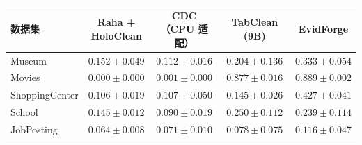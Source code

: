 \par\addvspace{6pt}\noindent\begin{minipage}{\columnwidth}
\centering
{}
\label{tab:real-main}
\fontsize{8}{9.6}\selectfont
\setlength{\tabcolsep}{1pt}
\renewcommand{\arraystretch}{1.10}
\begin{tabular*}{\columnwidth}{@{\extracolsep{\fill}}lcccc@{}}
\toprule
数据集 & \makecell{Raha +\\HoloClean} & \makecell{CDC\\（CPU 适配）} & TabClean (9B) & EvidForge \\
\midrule
Museum & $0.152\pm0.049$ & $0.112\pm0.016$ & $0.204\pm0.136$ & $\mathbf{0.333\pm0.054}$ \\
Movies & $0.000\pm0.000$ & $0.001\pm0.000$ & $0.877\pm0.016$ & $\mathbf{0.889\pm0.002}$ \\
ShoppingCenter & $0.106\pm0.019$ & $0.107\pm0.050$ & $0.145\pm0.026$ & $\mathbf{0.427\pm0.041}$ \\
School & $0.145\pm0.012$ & $0.090\pm0.019$ & $\mathbf{0.250\pm0.112}$ & $0.239\pm0.114$ \\
JobPosting & $0.064\pm0.008$ & $0.071\pm0.010$ & $0.078\pm0.075$ & $\mathbf{0.116\pm0.047}$ \\
\bottomrule
\end{tabular*}
\end{minipage}\par\addvspace{6pt}

